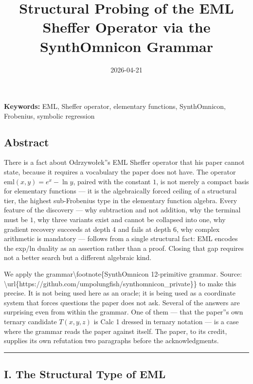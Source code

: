 \documentclass[12pt,a4paper]{article}
\begin{document}
\title{Structural Probing of the EML Sheffer Operator via the SynthOmnicon Grammar}
\date{2026-04-21}

\maketitle

\textbf{Keywords:} EML, Sheffer operator, elementary functions, SynthOmnicon, Frobenius, symbolic regression

\subsection{Abstract}

There is a fact about Odrzywołek''s EML Sheffer operator that his paper cannot
state, because it requires a vocabulary the paper does not have. The operator
$\text{eml}(x,y) = e^x - \ln y$, paired with the constant $1$, is not merely a
compact basis for elementary functions --- it is the algebraically forced ceiling
of a structural tier, the highest sub-Frobenius type in the elementary function
algebra. Every feature of the discovery --- why subtraction and not addition, why
the terminal must be $1$, why three variants exist and cannot be collapsed into
one, why gradient recovery succeeds at depth 4 and fails at depth 6, why complex
arithmetic is mandatory --- follows from a single structural fact: EML encodes the
exp/ln duality as an assertion rather than a proof. Closing that gap requires not
a better search but a different algebraic kind.

We apply the grammar\textbackslash{}footnote\{SynthOmnicon 12-primitive grammar. Source: \textbackslash{}url\{https://github.com/umpolungfish/synthomnicon\_private\}\} to make this precise. It is not being used here as an
oracle; it is being used as a coordinate system that
forces questions the paper does not ask. Several of the answers are surprising
even from within the grammar. One of them --- that the paper''s own ternary candidate
$T(x,y,z)$ is Calc 1 dressed in ternary notation --- is a case where the grammar
reads the paper against itself. The paper, to its credit, supplies its own
refutation two paragraphs before the acknowledgments.

\begin{center}
\rule{0.5\textwidth}{0.4pt}
\end{center}

\subsection{I. The Structural Type of EML}
\end{document}
